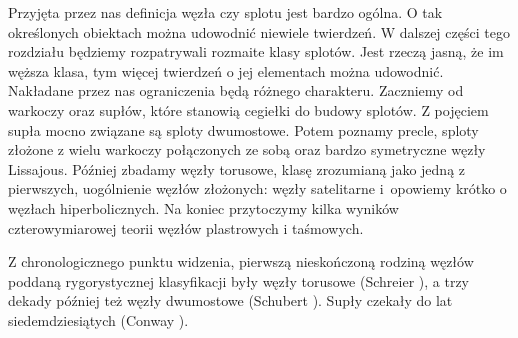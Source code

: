 
Przyjęta przez nas definicja węzła czy splotu jest bardzo ogólna.
O tak określonych obiektach można udowodnić niewiele twierdzeń.
W dalszej części tego rozdziału będziemy rozpatrywali rozmaite klasy splotów.
Jest rzeczą jasną, że im węższa klasa, tym więcej twierdzeń o jej elementach można udowodnić.
Nakładane przez nas ograniczenia będą różnego charakteru.
Zaczniemy od warkoczy oraz supłów, które stanowią cegiełki do budowy splotów.
Z pojęciem supła mocno związane są sploty dwumostowe.
Potem poznamy precle, sploty złożone z wielu warkoczy połączonych ze sobą oraz bardzo symetryczne węzły Lissajous.
Później zbadamy węzły torusowe, klasę zrozumianą jako jedną z pierwszych, uogólnienie węzłów złożonych: węzły satelitarne i~opowiemy krótko o węzłach hiperbolicznych.
Na koniec przytoczymy kilka wyników czterowymiarowej teorii węzłów plastrowych i taśmowych.

Z chronologicznego punktu widzenia, pierwszą nieskończoną rodziną węzłów poddaną rygorystycznej klasyfikacji były węzły torusowe (Schreier \cite{schreier24}), a trzy dekady później też węzły dwumostowe (Schubert \cite{schubert56}).
Supły czekały do lat siedemdziesiątych (Conway \cite{conway70}).
%
%

